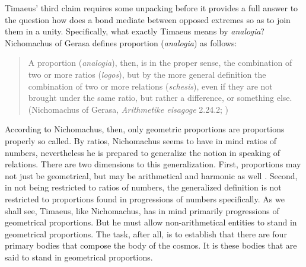 Timaeus' third claim requires some unpacking before it provides a full answer to the question how does a bond mediate between opposed extremes so as to join them in a unity. Specifically, what exactly Timaeus means by \emph{analogia}? Nichomachus of Gerasa defines proportion (\emph{analogia}) as follows:
\begin{quote}
	A proportion (\emph{analogia}), then, is in the proper sense, the combination of two or more ratios (\emph{logos}), but by the more general definition the combination of two or more relations (\emph{schesis}), even if they are not brought under the same ratio, but rather a difference, or something else. (Nichomachus of Gerasa, \emph{Arithmetike eisagoge} 2.24.2; \citealt[264--5]{Dooge:1926aa})
\end{quote}
According to Nichomachus, then, only geometric proportions are proportions properly so called. By ratios, Nichomachus seems to have in mind ratios of numbers, nevertheless he is prepared to generalize the notion in speaking of relations. There are two dimensions to this generalization. First, proportions may not just be geometrical, but may be arithmetical and harmonic as well \citep[264 n2]{Dooge:1926aa}. Second, in not being restricted to ratios of numbers, the generalized definition is not restricted to proportions found in progressions of numbers specifically. As we shall see, Timaeus, like Nichomachus, has in mind primarily progressions of geometrical proportions. But he must allow non-arithmetical entities to stand in geometrical proportions. The task, after all, is to establish that there are four primary bodies that compose the body of the cosmos. It is these bodies that are said to stand in geometrical proportions.

